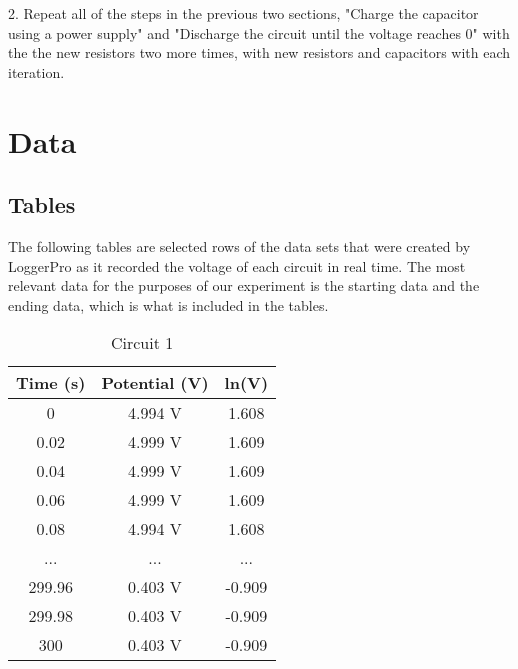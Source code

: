 \documentclass[12pt]{article}
\begin{document}
2. Repeat all of the steps in the previous two sections, "Charge the capacitor using a power supply" and "Discharge the circuit until the voltage reaches 0" with the the new resistors two more times, with new resistors and capacitors with each iteration.

\pagebreak
\section*{\centering Data}
\subsection*{Tables}


The following tables are selected rows of the data sets that were created by LoggerPro as it recorded the voltage of each circuit in real time. The most relevant data for the purposes of our experiment is the starting data and the ending data, which is what is included in the tables.

\begin{table}[h!]
\centering
\begin{tabular}{||c c c ||} 
 \hline
Time (s) & Potential (V) & ln(V) \\ [0.5ex] 
 \hline
 0 & 4.994 V & 1.608  \\ 
 0.02 & 4.999 V & 1.609  \\
 0.04 & 4.999 V & 1.609  \\ 
 0.06 & 4.999 V & 1.609  \\
 0.08 & 4.994 V & 1.608  \\ 
 ... & ... & ... \\
 299.96 & 0.403 V & -0.909 \\ 
 299.98 & 0.403 V & -0.909 \\
 300 & 0.403 V & -0.909  \\ 
 \hline
\end{tabular}
\caption{Circuit 1}
\end{table}
\end{document}
